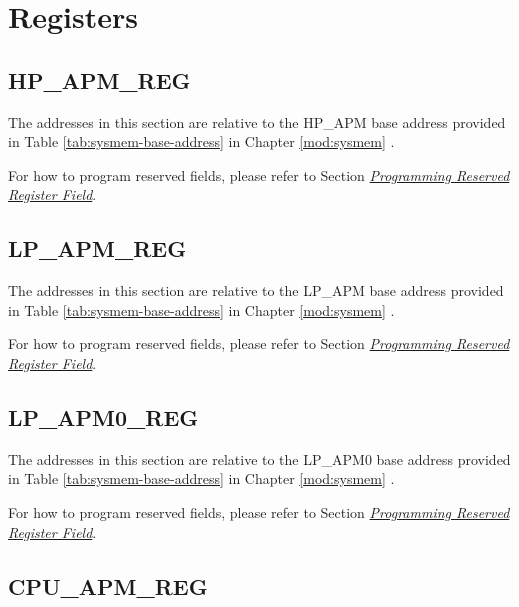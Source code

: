 \documentclass[main\_\_EN.tex]{subfiles}
\begin{document}
\newpage
\section{Registers}


\subsection{HP\_APM\_REG}

The addresses in this section are relative to the HP\_APM base address provided in Table \ref{tab:sysmem-base-address} in Chapter \ref{mod:sysmem} \textit{}.

For how to program reserved fields, please refer to Section \hyperref[programming-reserved-field]{\textit{Programming Reserved Register Field}}.



\subsection{LP\_APM\_REG}

The addresses in this section are relative to the LP\_APM base address provided in Table \ref{tab:sysmem-base-address} in Chapter \ref{mod:sysmem} \textit{}.

For how to program reserved fields, please refer to Section \hyperref[programming-reserved-field]{\textit{Programming Reserved Register Field}}.



\subsection{LP\_APM0\_REG}

The addresses in this section are relative to the LP\_APM0 base address provided in Table \ref{tab:sysmem-base-address} in Chapter \ref{mod:sysmem} \textit{}.

For how to program reserved fields, please refer to Section \hyperref[programming-reserved-field]{\textit{Programming Reserved Register Field}}.



\subsection{CPU\_APM\_REG}
\end{document}
